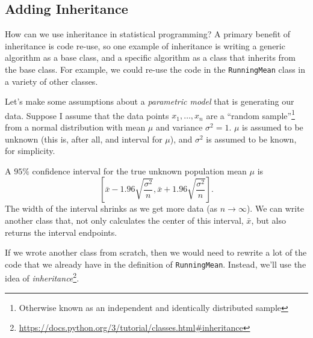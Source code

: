 \documentclass[
  12pt,
  krantz2]{krantz}
\renewcommand{\href}[2]{#2\footnote{\url{#1}}}
\begin{document}
\hypertarget{adding-inheritance}{%
\subsection{Adding Inheritance}\label{adding-inheritance}}

How can we use inheritance in statistical programming? A primary benefit of inheritance is code re-use, so one example of inheritance is writing a generic algorithm as a base class, and a specific algorithm as a class that inherits from the base class. For example, we could re-use the code in the \texttt{RunningMean} class in a variety of other classes.

Let's make some assumptions about a \emph{parametric model} that is generating our data. Suppose I assume that the data points \(x_1, \ldots, x_n\) are a ``random sample''\footnote{Otherwise known as an independent and identically distributed sample} from a normal distribution with mean \(\mu\) and variance \(\sigma^2=1\). \(\mu\) is assumed to be unknown (this is, after all, and interval for \(\mu\)), and \(\sigma^2\) is assumed to be known, for simplicity.

A \(95\%\) confidence interval for the true unknown population mean \(\mu\) is
\[
\left[\bar{x} - 1.96 \sqrt{\frac{\sigma^2}{n}}, \bar{x} + 1.96 \sqrt{\frac{\sigma^2}{n}} \right].
\]
The width of the interval shrinks as we get more data (as \(n \to \infty\)). We can write another class that, not only calculates the center of this interval, \(\bar{x}\), but also returns the interval endpoints.

If we wrote another class from scratch, then we would need to rewrite a lot of the code that we already have in the definition of \texttt{RunningMean}. Instead, we'll use the idea of \href{https://docs.python.org/3/tutorial/classes.html\#inheritance}{\emph{inheritance}}.
\end{document}
